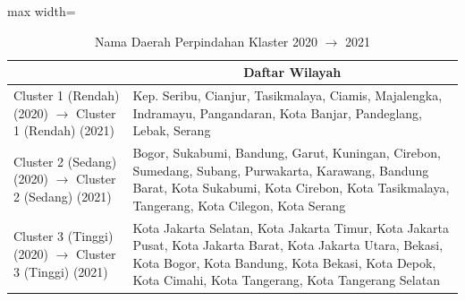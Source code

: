 \begin{table}[H]
\centering
\caption{Nama Daerah Perpindahan Klaster 2020 \(\rightarrow\) 2021} \label{tab:app1transname2020x2021}
\begin{adjustbox}{max width=\textwidth}
\begin{tabular}{|>{\centering\arraybackslash}p{4cm}|p{10cm}|}
\hline
\multicolumn{1}{|c|}{\textbf{Kategori}} & \multicolumn{1}{c|}{\textbf{Daftar Wilayah}} \\
\hline
Cluster 1 (Rendah) (2020) \(\rightarrow\) Cluster 1 (Rendah) (2021) & Kep. Seribu, Cianjur, Tasikmalaya, Ciamis, Majalengka, Indramayu, Pangandaran, Kota Banjar, Pandeglang, Lebak, Serang \\
\hline
Cluster 2 (Sedang) (2020) \(\rightarrow\) Cluster 2 (Sedang) (2021) & Bogor, Sukabumi, Bandung, Garut, Kuningan, Cirebon, Sumedang, Subang, Purwakarta, Karawang, Bandung Barat, Kota Sukabumi, Kota Cirebon, Kota Tasikmalaya, Tangerang, Kota Cilegon, Kota Serang \\
\hline
Cluster 3 (Tinggi) (2020) \(\rightarrow\) Cluster 3 (Tinggi) (2021) & Kota Jakarta Selatan, Kota Jakarta Timur, Kota Jakarta Pusat, Kota Jakarta Barat, Kota Jakarta Utara, Bekasi, Kota Bogor, Kota Bandung, Kota Bekasi, Kota Depok, Kota Cimahi, Kota Tangerang, Kota Tangerang Selatan \\
\hline
\end{tabular}
\end{adjustbox}
\end{table}